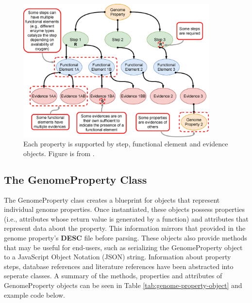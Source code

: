 \begin{figure}[!ht]
  \centering
	\includegraphics[width=0.90\textwidth]{media/Figure_1B.eps}
	 \caption{Each property is supported by step, functional element and evidence objects. Figure is from \cite{bergstrand2019pygenprop}.}
	 \label{fig:property}
\end{figure}

\subsection{The GenomeProperty Class} \label{genome-property-class}

The GenomeProperty class creates a blueprint for objects that represent individual genome properties. Once instantiated, these objects possess properties (i.e., attributes whose return value is generated by a function) and attributes that represent data about the property. This information mirrors that provided in the genome property's \textbf{DESC} file before parsing. These objects also provide methods that may be useful for end-users, such as serializing the GenomeProperty object to a JavaScript Object Notation (JSON) \cite{bray2014rfc} string. Information about property steps, database references and literature references have been abstracted into seperate classes. A summary of the methods, properties and attributes of GenomeProperty objects can be seen in Table \ref{tab:genome-property-object} and example code below.

